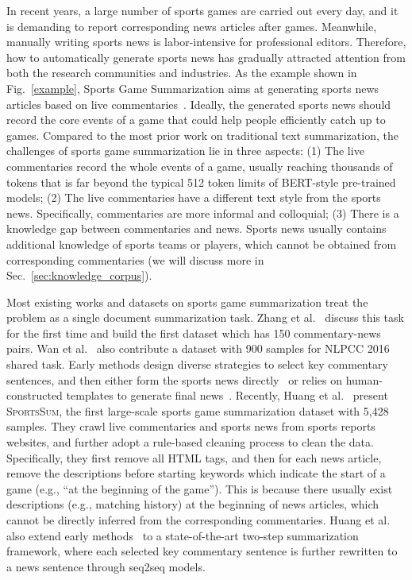 In recent years, a large number of sports games are carried out every day, and it is demanding to report corresponding news articles after games. Meanwhile, manually writing sports news is labor-intensive for professional editors.
Therefore, how to automatically generate sports news has gradually attracted attention from both the research communities and industries.
As the example shown in Fig.~\ref{example}, Sports Game Summarization aims at generating sports news articles based on live commentaries~\cite{zhang-etal-2016-towards}. Ideally, the generated sports news should record the core events of a game that could help people efficiently catch up to games.
Compared to the most prior work on traditional text summarization, the challenges of sports game summarization lie in three aspects:
(1) The live commentaries record the whole events of a game, usually reaching thousands of tokens that is far beyond the typical 512 token limits of BERT-style pre-trained models;
(2) The live commentaries have a different text style from the sports news. Specifically, commentaries are more informal and colloquial;
(3) There is a knowledge gap between commentaries and news. Sports news usually contains additional knowledge of sports teams or players, which cannot be obtained from corresponding commentaries (we will discuss more in Sec.~\ref{sec:knowledge_corpus}).

Most existing works and datasets on sports game summarization treat the problem as a single document summarization task.
Zhang et al.~\cite{zhang-etal-2016-towards} discuss this task for the first time and build the first dataset which has 150 commentary-news pairs. Wan et al.~\cite{Wan2016OverviewOT} also contribute a dataset with 900 samples for NLPCC 2016 shared task. Early methods design diverse strategies to select key commentary sentences, and then either form the sports news directly~\cite{zhang-etal-2016-towards,Zhu2016ResearchOS,Yao2017ContentSF} or relies on human-constructed templates to generate final news~\cite{Liu2016SportsNG,lv2020generate}.
Recently, Huang et al.~\cite{Huang2020GeneratingSN} present \textsc{SportsSum}, the first large-scale sports game summarization dataset with 5,428 samples. They crawl live commentaries and sports news from sports reports websites, and further adopt a rule-based cleaning process to clean the data.
Specifically, they first remove all HTML tags, and then for each news article, remove the descriptions before starting keywords which indicate the start of a game (e.g., ``at the beginning of the game'').
This is because there usually exist descriptions (e.g., matching history) at the beginning of news articles, which cannot be directly inferred from the corresponding commentaries.
Huang et al.~\cite{Huang2020GeneratingSN} also extend early methods~\cite{zhang-etal-2016-towards,Zhu2016ResearchOS,Yao2017ContentSF,Liu2016SportsNG,lv2020generate} to a state-of-the-art two-step summarization framework, where each selected key commentary sentence is further rewritten to a news sentence through seq2seq models.

